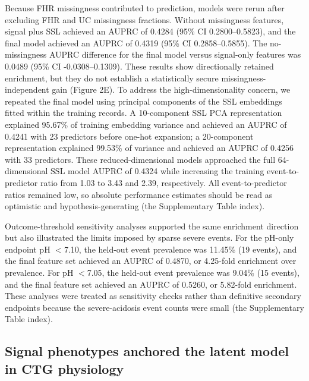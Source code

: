 \documentclass[utf8]{FrontiersinHarvard}
\begin{document}
Because FHR missingness contributed to prediction, models were rerun after excluding FHR and UC missingness fractions. Without missingness features, signal plus SSL achieved an AUPRC of 0.4284 (95\% CI 0.2800--0.5823), and the final model achieved an AUPRC of 0.4319 (95\% CI 0.2858--0.5855). The no-missingness AUPRC difference for the final model versus signal-only features was 0.0489 (95\% CI -0.0308--0.1309). These results show directionally retained enrichment, but they do not establish a statistically secure missingness-independent gain (Figure 2E). To address the high-dimensionality concern, we repeated the final model using principal components of the SSL embeddings fitted within the training records. A 10-component SSL PCA representation explained 95.67\% of training embedding variance and achieved an AUPRC of 0.4241 with 23 predictors before one-hot expansion; a 20-component representation explained 99.53\% of variance and achieved an AUPRC of 0.4256 with 33 predictors. These reduced-dimensional models approached the full 64-dimensional SSL model AUPRC of 0.4324 while increasing the training event-to-predictor ratio from 1.03 to 3.43 and 2.39, respectively. All event-to-predictor ratios remained low, so absolute performance estimates should be read as optimistic and hypothesis-generating (the Supplementary Table index).

Outcome-threshold sensitivity analyses supported the same enrichment direction but also illustrated the limits imposed by sparse severe events. For the pH-only endpoint pH $<$7.10, the held-out event prevalence was 11.45\% (19 events), and the final feature set achieved an AUPRC of 0.4870, or 4.25-fold enrichment over prevalence. For pH $<$7.05, the held-out event prevalence was 9.04\% (15 events), and the final feature set achieved an AUPRC of 0.5260, or 5.82-fold enrichment. These analyses were treated as sensitivity checks rather than definitive secondary endpoints because the severe-acidosis event counts were small (the Supplementary Table index).

\subsection{Signal phenotypes anchored the latent model in CTG physiology}
\end{document}
